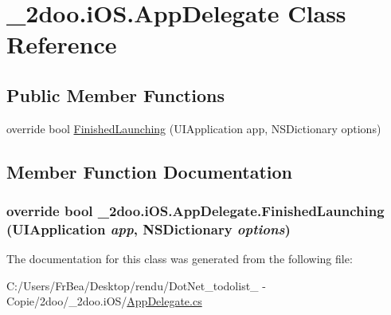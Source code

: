 \hypertarget{class__2doo_1_1i_o_s_1_1_app_delegate}{
\section{\_\-2doo.iOS.AppDelegate Class Reference}
\label{class__2doo_1_1i_o_s_1_1_app_delegate}
}
\subsection*{Public Member Functions}
\begin{CompactItemize}
\item 
override bool \hyperlink{class__2doo_1_1i_o_s_1_1_app_delegate_771936531313b1735b7ea29fccf76b39}{FinishedLaunching} (UIApplication app, NSDictionary options)
\end{CompactItemize}


\subsection{Member Function Documentation}
\hypertarget{class__2doo_1_1i_o_s_1_1_app_delegate_771936531313b1735b7ea29fccf76b39}{
\subsubsection[{FinishedLaunching}]{\setlength{\rightskip}{0pt plus 5cm}override bool \_\-2doo.iOS.AppDelegate.FinishedLaunching (UIApplication {\em app}, \/  NSDictionary {\em options})}}
\label{class__2doo_1_1i_o_s_1_1_app_delegate_771936531313b1735b7ea29fccf76b39}




The documentation for this class was generated from the following file:\begin{CompactItemize}
\item 
C:/Users/FrBea/Desktop/rendu/DotNet\_\-todolist\_ - Copie/2doo/\_\-2doo.iOS/\hyperlink{_app_delegate_8cs}{AppDelegate.cs}\end{CompactItemize}
